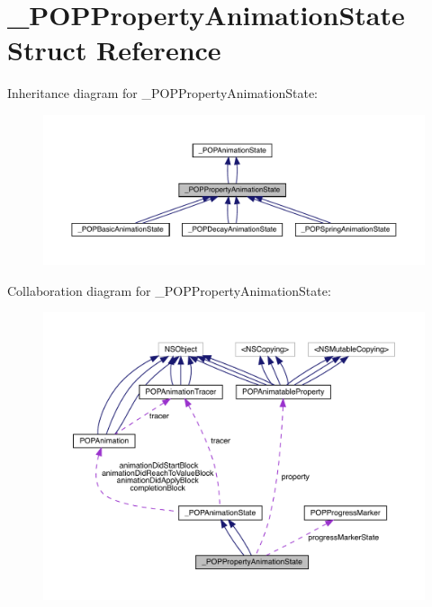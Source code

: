 \hypertarget{struct___p_o_p_property_animation_state}{}\section{\+\_\+\+P\+O\+P\+Property\+Animation\+State Struct Reference}
\label{struct___p_o_p_property_animation_state}


Inheritance diagram for \+\_\+\+P\+O\+P\+Property\+Animation\+State\+:\nopagebreak
\begin{figure}[H]
\begin{center}
\leavevmode
\includegraphics[width=350pt]{struct___p_o_p_property_animation_state__inherit__graph}
\end{center}
\end{figure}


Collaboration diagram for \+\_\+\+P\+O\+P\+Property\+Animation\+State\+:\nopagebreak
\begin{figure}[H]
\begin{center}
\leavevmode
\includegraphics[width=350pt]{struct___p_o_p_property_animation_state__coll__graph}
\end{center}
\end{figure}

